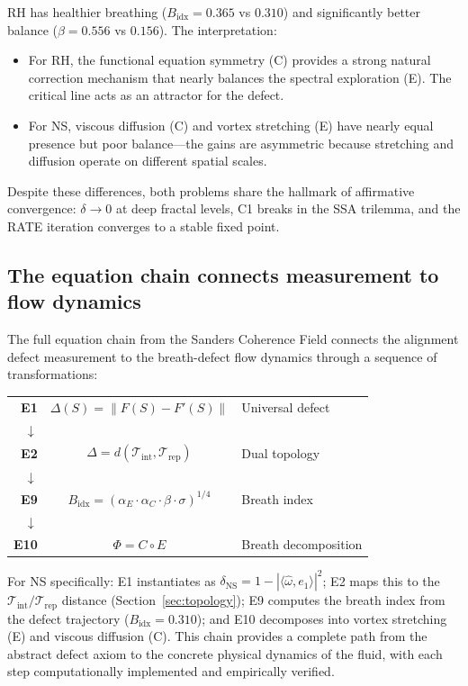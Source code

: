 \documentclass[11pt]{article}
\theoremstyle{definition}
\theoremstyle{remark}
\begin{document}
\noindent
RH has healthier breathing ($B_{\mathrm{idx}} = 0.365$ vs $0.310$) and
significantly better balance ($\beta = 0.556$ vs $0.156$).  The interpretation:
\begin{itemize}[nosep]
  \item For RH, the functional equation symmetry (C) provides a strong natural
    correction mechanism that nearly balances the spectral exploration (E).
    The critical line acts as an attractor for the defect.
  \item For NS, viscous diffusion (C) and vortex stretching (E) have nearly
    equal presence but poor balance---the gains are asymmetric because
    stretching and diffusion operate on different spatial scales.
\end{itemize}

Despite these differences, both problems share the hallmark of affirmative
convergence: $\delta \to 0$ at deep fractal levels, C1 breaks in the SSA
trilemma, and the RATE iteration converges to a stable fixed point.

\subsection{The equation chain connects measurement to flow dynamics}

The full equation chain from the Sanders Coherence Field connects the
alignment defect measurement to the breath-defect flow dynamics through
a sequence of transformations:

\begin{center}
\begin{tabular}{rcl}
\textbf{E1} & $\Delta(S) = \|F(S) - F'(S)\|$ & Universal defect \\
$\downarrow$ & & \\
\textbf{E2} & $\Delta = d(\mathcal{T}_{\mathrm{int}}, \mathcal{T}_{\mathrm{rep}})$ & Dual topology \\
$\downarrow$ & & \\
\textbf{E9} & $B_{\mathrm{idx}} = (\alpha_E \cdot \alpha_C \cdot \beta \cdot \sigma)^{1/4}$ & Breath index \\
$\downarrow$ & & \\
\textbf{E10} & $\Phi = C \circ E$ & Breath decomposition \\
\end{tabular}
\end{center}

\noindent
For NS specifically: E1 instantiates as $\delta_{\mathrm{NS}} = 1 - |\langle
\hat\omega, e_1\rangle|^2$; E2 maps this to the
$\mathcal{T}_{\mathrm{int}}/\mathcal{T}_{\mathrm{rep}}$ distance
(Section~\ref{sec:topology}); E9 computes the breath index from the
defect trajectory ($B_{\mathrm{idx}} = 0.310$); and E10 decomposes into
vortex stretching (E) and viscous diffusion (C).  This chain provides
a complete path from the abstract defect axiom to the concrete
physical dynamics of the fluid, with each step computationally implemented
and empirically verified.
\end{document}
